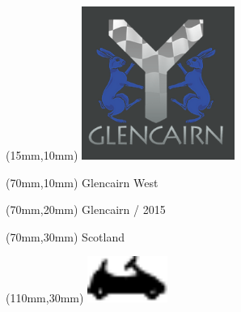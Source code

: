 \null\newpage
\begin{textblock*}{50mm}(15mm,10mm)%
\includegraphics[width=50mm]{LG/GLCN.png}
\end{textblock*}
\begin{textblock*}{130mm}(70mm,10mm)%
{\fontsize{20}{20}\selectfont Glencairn West}\\
\end{textblock*}
\begin{textblock*}{120mm}(70mm,20mm)%
{\fontsize{16}{16}\selectfont Glencairn / 2015}\\
\end{textblock*}
\begin{textblock*}{120mm}(70mm,30mm)%
{\fontsize{12}{12}\selectfont Scotland}
\end{textblock*}
\begin{textblock*}{30mm}(110mm,30mm)%
\centering
\includegraphics[height=15mm]{icons/kart.pdf}
\end{textblock*}
